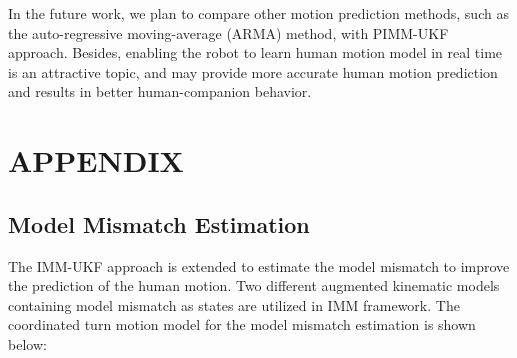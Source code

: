 \documentclass[journal]{IEEEtran}
\begin{document}
	In the future work, we plan to compare other motion prediction methods, such as the auto-regressive moving-average (ARMA) method, with PIMM-UKF approach.
	Besides, enabling the robot to learn human motion model in real time is an attractive topic, and may provide more accurate human motion prediction and results in better human-companion behavior.
	
	\section*{APPENDIX}
	\subsection{Model Mismatch Estimation}
    The IMM-UKF approach is extended to estimate the model mismatch to improve the prediction of the human motion. Two different augmented kinematic models containing model mismatch as states are utilized in IMM framework. The coordinated turn motion model for the model mismatch estimation is shown below:
\end{document}
